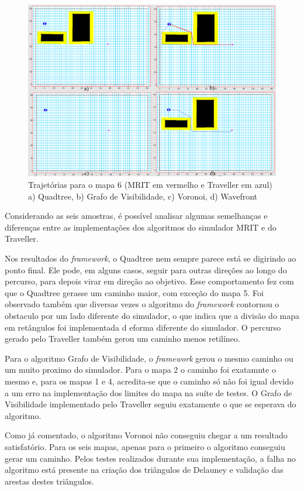 \begin{figure}[h]
	\centering
	\label{fig44}
		\includegraphics[keepaspectratio=true,scale=0.25]{figuras/mapa6.jpg}
	\caption{Trajetórias para o mapa 6 (MRIT em vermelho e Traveller em azul) a) Quadtree, b) Grafo de Visibilidade, c) Voronoi, d) Wavefront}
\end{figure}

Considerando as seis amostras, é possível analisar algumas semelhanças e diferenças entre as implementações dos algoritmos do simulador MRIT e do Traveller.

Nos resultados do \textit{framework}, o Quadtree nem sempre parece está se digirindo ao ponto final. Ele pode, em alguns casos, seguir para outras direções ao longo do percurso, para depois virar em direção ao objetivo. Esse comportamento fez com que o Quadtree gerasse um caminho maior, com exceção do mapa 5. Foi observado também que diversas vezes o algoritmo do \textit{framework} contornou o obstaculo por um lado diferente do simulador, o que indica que a divisão do mapa em retângulos foi implementada d eforma diferente do simulador. O percurso gerado pelo Traveller também gerou um caminho menos retilíneo.

Para o algoritmo Grafo de Visibilidade, o \textit{framework} gerou o mesmo caminho ou um muito proximo do simulador. Para o mapa 2 o caminho foi exatamnte o mesmo e, para os mapas 1 e 4, acredita-se que o caminho só não foi igual devido a um erro na implementação dos limites do mapa na suíte de testes. O Grafo de Visibilidade implementado pelo Traveller seguiu exatamente o que se esperava do algoritmo.

Como já comentado, o algoritmo Voronoi não conseguiu chegar a um resultado satisfatório. Para os seis mapas, apenas para o primeiro o algoritmo conseguiu gerar um caminho. Pelos testes realizados durante sua implementação, a falha no algoritmo está presente na criação dos triângulos de Delauney e validação das arestas destes triângulos.

